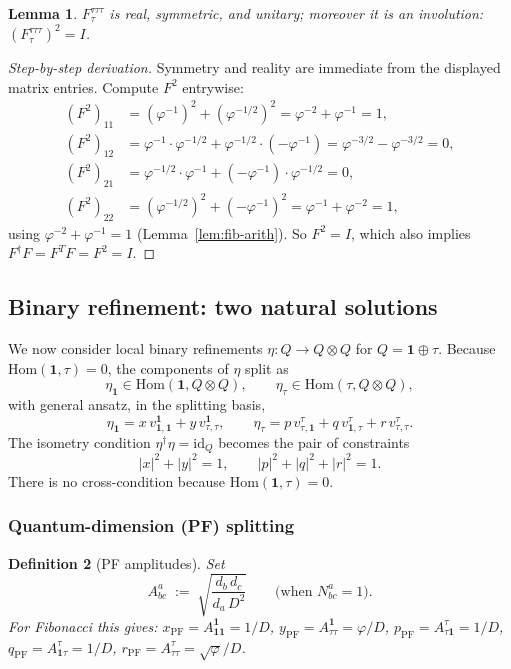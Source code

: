 \documentclass[11pt,a4paper]{article}
\newtheorem{definition}{Definition}[section]
\newtheorem{lemma}[definition]{Lemma}
\theoremstyle{definition}
\newcommand{\Hom}{\mathrm{Hom}}
\newcommand{\id}{\mathrm{id}}
\newcommand{\one}{\mathbf{1}}
\begin{document}
\begin{lemma}\label{lem:F-invol}
$F^{\tau\tau\tau}_\tau$ is real, symmetric, and unitary; moreover it is an
involution: $(F^{\tau\tau\tau}_\tau)^{2} = I$.
\end{lemma}

\begin{proof}[Step-by-step derivation]
Symmetry and reality are immediate from the displayed matrix entries.
Compute $F^{2}$ entrywise:
\begin{align*}
(F^{2})_{11} &= (\varphi^{-1})^{2} + (\varphi^{-1/2})^{2} = \varphi^{-2}+\varphi^{-1} = 1,\\
(F^{2})_{12} &= \varphi^{-1}\!\cdot\!\varphi^{-1/2} + \varphi^{-1/2}\!\cdot\!(-\varphi^{-1})
            = \varphi^{-3/2}-\varphi^{-3/2} = 0,\\
(F^{2})_{21} &= \varphi^{-1/2}\!\cdot\!\varphi^{-1} + (-\varphi^{-1})\!\cdot\!\varphi^{-1/2}
            = 0,\\
(F^{2})_{22} &= (\varphi^{-1/2})^{2} + (-\varphi^{-1})^{2}
            = \varphi^{-1}+\varphi^{-2} = 1,
\end{align*}
using $\varphi^{-2}+\varphi^{-1}=1$ (Lemma~\ref{lem:fib-arith}). So $F^{2} = I$,
which also implies $F^{\dagger}F = F^{T}F = F^{2}=I$.
\end{proof}

\subsection{Binary refinement: two natural solutions}

We now consider local binary refinements $\eta:Q\to Q\otimes Q$ for $Q = \one\oplus\tau$. Because $\Hom(\one,\tau) = 0$, the components of $\eta$ split as
\[
\eta_\one \in \Hom(\one,Q\otimes Q), \qquad
\eta_\tau \in \Hom(\tau,Q\otimes Q),
\]
with general ansatz, in the splitting basis,
\[
\eta_\one = x\,v^{\one}_{\one,\one} + y\,v^{\one}_{\tau,\tau}, \qquad
\eta_\tau = p\,v^{\tau}_{\tau,\one} + q\,v^{\tau}_{\one,\tau} + r\,v^{\tau}_{\tau,\tau}.
\]
The isometry condition $\eta^\dagger\eta = \id_Q$ becomes the pair of
constraints
\[
|x|^{2}+|y|^{2}=1, \qquad |p|^{2}+|q|^{2}+|r|^{2}=1.
\]
There is no cross-condition because $\Hom(\one,\tau)=0$.

\subsubsection{Quantum-dimension (PF) splitting}

\begin{definition}[PF amplitudes]\label{def:PF}
Set
\[
A^{a}_{bc} \;:=\; \sqrt{\frac{d_b\,d_c}{d_a\,D^{2}}} \qquad \text{(when $N_{bc}^a = 1$).}
\]
For Fibonacci this gives:
$x_{\mathrm{PF}} = A^{\one}_{\one\one} = 1/D$,
$y_{\mathrm{PF}} = A^{\one}_{\tau\tau} = \varphi/D$,
$p_{\mathrm{PF}} = A^{\tau}_{\tau\one} = 1/D$,
$q_{\mathrm{PF}} = A^{\tau}_{\one\tau} = 1/D$,
$r_{\mathrm{PF}} = A^{\tau}_{\tau\tau} = \sqrt{\varphi}/D$.
\end{definition}
\end{document}
